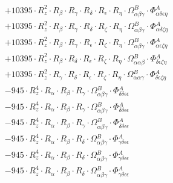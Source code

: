 \documentclass{article}
\begin{document}
\begin{subequations}
\begin{gather}
\begin{array}{c}
 \\[0.2em] 		 + 10395 \cdot R_{z}^{2} \cdot R_{\beta{}} \cdot R_{\gamma{}} \cdot R_{\delta{}} \cdot R_{\epsilon{}} \cdot R_{\eta{}} \cdot \Omega{}^{B}_{\alpha{}\beta{}\gamma{}} \cdot \Phi{}^{A}_{\alpha{}\delta{}\epsilon{}\eta{}} 
 \\[0.2em] 		 + 10395 \cdot R_{z}^{2} \cdot R_{\beta{}} \cdot R_{\gamma{}} \cdot R_{\delta{}} \cdot R_{\zeta{}} \cdot R_{\eta{}} \cdot \Omega{}^{B}_{\alpha{}\beta{}\gamma{}} \cdot \Phi{}^{A}_{\alpha{}\delta{}\zeta{}\eta{}} 
 \\[0.2em] 		 + 10395 \cdot R_{z}^{2} \cdot R_{\beta{}} \cdot R_{\gamma{}} \cdot R_{\epsilon{}} \cdot R_{\zeta{}} \cdot R_{\eta{}} \cdot \Omega{}^{B}_{\alpha{}\beta{}\gamma{}} \cdot \Phi{}^{A}_{\alpha{}\epsilon{}\zeta{}\eta{}} 
 \\[0.2em] 		 + 10395 \cdot R_{z}^{2} \cdot R_{\beta{}} \cdot R_{\delta{}} \cdot R_{\epsilon{}} \cdot R_{\zeta{}} \cdot R_{\eta{}} \cdot \Omega{}^{B}_{\alpha{}\alpha{}\beta{}} \cdot \Phi{}^{A}_{\delta{}\epsilon{}\zeta{}\eta{}} 
 \\[0.2em] 		 + 10395 \cdot R_{z}^{2} \cdot R_{\gamma{}} \cdot R_{\delta{}} \cdot R_{\epsilon{}} \cdot R_{\zeta{}} \cdot R_{\eta{}} \cdot \Omega{}^{B}_{\alpha{}\alpha{}\gamma{}} \cdot \Phi{}^{A}_{\delta{}\epsilon{}\zeta{}\eta{}} 
 \\[0.2em] 		 - 945 \cdot R_{z}^{4} \cdot R_{\alpha{}} \cdot R_{\beta{}} \cdot R_{\gamma{}} \cdot \Omega{}^{B}_{\alpha{}\beta{}\gamma{}} \cdot \Phi{}^{A}_{\delta{}\delta{}\epsilon{}\epsilon{}} 
 \\[0.2em] 		 - 945 \cdot R_{z}^{4} \cdot R_{\alpha{}} \cdot R_{\beta{}} \cdot R_{\gamma{}} \cdot \Omega{}^{B}_{\alpha{}\beta{}\gamma{}} \cdot \Phi{}^{A}_{\delta{}\delta{}\epsilon{}\epsilon{}} 
 \\[0.2em] 		 - 945 \cdot R_{z}^{4} \cdot R_{\alpha{}} \cdot R_{\beta{}} \cdot R_{\gamma{}} \cdot \Omega{}^{B}_{\alpha{}\beta{}\gamma{}} \cdot \Phi{}^{A}_{\delta{}\delta{}\epsilon{}\epsilon{}} 
 \\[0.2em] 		 - 945 \cdot R_{z}^{4} \cdot R_{\alpha{}} \cdot R_{\beta{}} \cdot R_{\delta{}} \cdot \Omega{}^{B}_{\alpha{}\beta{}\gamma{}} \cdot \Phi{}^{A}_{\gamma{}\delta{}\epsilon{}\epsilon{}} 
 \\[0.2em] 		 - 945 \cdot R_{z}^{4} \cdot R_{\alpha{}} \cdot R_{\beta{}} \cdot R_{\delta{}} \cdot \Omega{}^{B}_{\alpha{}\beta{}\gamma{}} \cdot \Phi{}^{A}_{\gamma{}\delta{}\epsilon{}\epsilon{}} 
 \\[0.2em] 		 - 945 \cdot R_{z}^{4} \cdot R_{\alpha{}} \cdot R_{\beta{}} \cdot R_{\delta{}} \cdot \Omega{}^{B}_{\alpha{}\beta{}\gamma{}} \cdot \Phi{}^{A}_{\gamma{}\delta{}\epsilon{}\epsilon{}} 

\end{array}
\end{gather}
\end{subequations}
\end{document}
